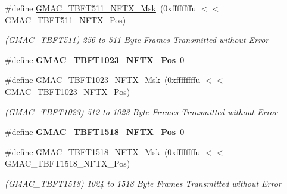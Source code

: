 \begin{DoxyCompactItemize}
\item 
\mbox{\label{group__SAME70__GMAC_ga2660fb762eb35ec0a1b97fa325df61d3}} 
\#define \mbox{\hyperlink{group__SAME70__GMAC_ga2660fb762eb35ec0a1b97fa325df61d3}{G\+M\+A\+C\+\_\+\+T\+B\+F\+T511\+\_\+\+N\+F\+T\+X\+\_\+\+Msk}}~(0xffffffffu $<$$<$ G\+M\+A\+C\+\_\+\+T\+B\+F\+T511\+\_\+\+N\+F\+T\+X\+\_\+\+Pos)
\begin{DoxyCompactList}\small\item\em (G\+M\+A\+C\+\_\+\+T\+B\+F\+T511) 256 to 511 Byte Frames Transmitted without Error \end{DoxyCompactList}\item 
\mbox{\label{group__SAME70__GMAC_ga35c50dea65101a60cbc1cd7752a77a95}} 
\#define {\bfseries G\+M\+A\+C\+\_\+\+T\+B\+F\+T1023\+\_\+\+N\+F\+T\+X\+\_\+\+Pos}~0
\item 
\mbox{\label{group__SAME70__GMAC_ga350b1771a573ff12864f2535bbc778f0}} 
\#define \mbox{\hyperlink{group__SAME70__GMAC_ga350b1771a573ff12864f2535bbc778f0}{G\+M\+A\+C\+\_\+\+T\+B\+F\+T1023\+\_\+\+N\+F\+T\+X\+\_\+\+Msk}}~(0xffffffffu $<$$<$ G\+M\+A\+C\+\_\+\+T\+B\+F\+T1023\+\_\+\+N\+F\+T\+X\+\_\+\+Pos)
\begin{DoxyCompactList}\small\item\em (G\+M\+A\+C\+\_\+\+T\+B\+F\+T1023) 512 to 1023 Byte Frames Transmitted without Error \end{DoxyCompactList}\item 
\mbox{\label{group__SAME70__GMAC_ga6ccbcc0be0dc921898746792d7689d6d}} 
\#define {\bfseries G\+M\+A\+C\+\_\+\+T\+B\+F\+T1518\+\_\+\+N\+F\+T\+X\+\_\+\+Pos}~0
\item 
\mbox{\label{group__SAME70__GMAC_gacf9a10035bec1875a2c2b26da26bcd0f}} 
\#define \mbox{\hyperlink{group__SAME70__GMAC_gacf9a10035bec1875a2c2b26da26bcd0f}{G\+M\+A\+C\+\_\+\+T\+B\+F\+T1518\+\_\+\+N\+F\+T\+X\+\_\+\+Msk}}~(0xffffffffu $<$$<$ G\+M\+A\+C\+\_\+\+T\+B\+F\+T1518\+\_\+\+N\+F\+T\+X\+\_\+\+Pos)
\begin{DoxyCompactList}\small\item\em (G\+M\+A\+C\+\_\+\+T\+B\+F\+T1518) 1024 to 1518 Byte Frames Transmitted without Error \end{DoxyCompactList}\item 
$$
\end{DoxyCompactItemize}
